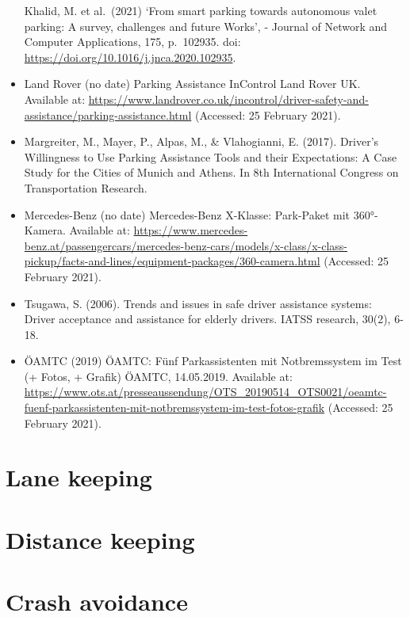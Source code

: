 \documentclass[
]{book}
\begin{document}
\begin{itemize}
  Khalid, M. et al.~(2021) `From smart parking towards autonomous valet parking: A survey, challenges and future Works', - Journal of Network and Computer Applications, 175, p.~102935. doi: \url{https://doi.org/10.1016/j.jnca.2020.102935}.
\item
  Land Rover (no date) Parking Assistance \textbar{} InControl \textbar{} Land Rover UK. Available at: \url{https://www.landrover.co.uk/incontrol/driver-safety-and-assistance/parking-assistance.html} (Accessed: 25 February 2021).
\item
  Margreiter, M., Mayer, P., Alpas, M., \& Vlahogianni, E. (2017). Driver's Willingness to Use Parking Assistance Tools and their Expectations: A Case Study for the Cities of Munich and Athens. In 8th International Congress on Transportation Research.
\item
  Mercedes-Benz (no date) Mercedes-Benz X-Klasse: Park-Paket mit 360°-Kamera. Available at: \url{https://www.mercedes-benz.at/passengercars/mercedes-benz-cars/models/x-class/x-class-pickup/facts-and-lines/equipment-packages/360-camera.html} (Accessed: 25 February 2021).
\item
  Tsugawa, S. (2006). Trends and issues in safe driver assistance systems: Driver acceptance and assistance for elderly drivers. IATSS research, 30(2), 6-18.
\item
  ÖAMTC (2019) ÖAMTC: Fünf Parkassistenten mit Notbremssystem im Test (+ Fotos, + Grafik) \textbar{} ÖAMTC, 14.05.2019. Available at: \url{https://www.ots.at/presseaussendung/OTS_20190514_OTS0021/oeamtc-fuenf-parkassistenten-mit-notbremssystem-im-test-fotos-grafik} (Accessed: 25 February 2021).
\end{itemize}

\hypertarget{lane_keeping}{%
\section{Lane keeping}\label{lane_keeping}}

\hypertarget{distance_keeping}{%
\section{Distance keeping}\label{distance_keeping}}

\hypertarget{crash_avoid}{%
\section{Crash avoidance}\label{crash_avoid}}
\end{document}
